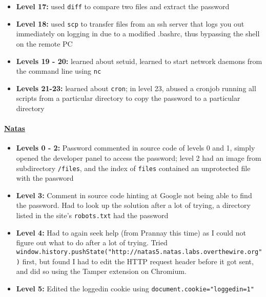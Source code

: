 \documentclass{article}
\def\code#1{\texttt{#1}}
\begin{document}
\begin{itemize}
\begin{itemize}
    \item \textbf{Level 17: } used \code{diff} to compare two files and extract the password
    
    \item \textbf{Level 18: } used \code{scp} to transfer files from an ssh server that logs you out immediately on logging in due to a modified .bashrc, thus bypassing the shell on the remote PC
    
    \item \textbf{Levels 19 - 20: } learned about setuid, learned to start network daemons from the command line using \code{nc}
    
    \item \textbf{Levels 21-23: } learned about \code{cron}; in level 23, abused a cronjob running all scripts from a particular directory to copy the password to a particular directory

\end{itemize}

\paragraph{\href{http://overthewire.org/wargames/bandit}{Natas}}

\begin{itemize}
    
    \item \textbf{Levels 0 - 2: } Password commented in source code of levels 0 and 1, simply opened the developer panel to access the password; level 2 had an image from subdirectory \code{/files}, and the index of \code{files} contained an unprotected file with the password
    
    \item \textbf{Level 3: } Comment in source code hinting at Google not being able to find the password. Had to look up the solution after a lot of trying, a directory listed in the site's \code{robots.txt} had the password
    
    \item \textbf{Level 4: } Had to again seek help (from Prannay this time) as I could not figure out what to do after a lot of trying. Tried \code{window.history.pushState("http://natas5.natas.labs.overthewire.org")} first, but found I had to edit the HTTP request header before it got sent, and did so using the Tamper extension on Chromium.
    
    \item \textbf{Level 5: } Edited the loggedin cookie using \code{document.cookie="loggedin=1"}
    

\end{itemize}
\end{itemize}
\end{document}
